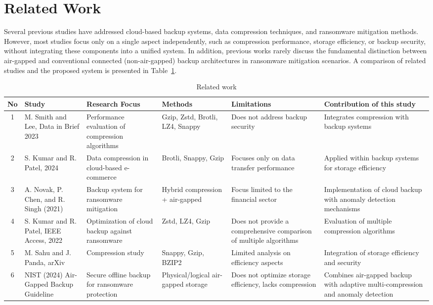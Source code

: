 \documentclass{iaesarticle}
\begin{document}
\section{Related Work}
\label{sec:related_work}
Several previous studies have addressed cloud-based backup systems, data compression techniques, and ransomware mitigation methods. However, most studies focus only on a single aspect independently, such as compression performance, storage efficiency, or backup security, without integrating these components into a unified system. In addition, previous works rarely discuss the fundamental distinction between air-gapped and conventional connected (non-air-gapped) backup architectures in ransomware mitigation scenarios. A comparison of related studies and the proposed system is presented in Table~\ref{tab:related_work}.

\begin{table}[H]
\centering
\fontsize{8pt}{10pt}\selectfont
\caption{Related work}
\label{tab:related_work}
\begin{tabularx}{\textwidth}{@{}c p{2.2cm} X X X X@{}}
\hline
\textbf{No} & \textbf{Study} & \textbf{Research Focus} & \textbf{Methods} & \textbf{Limitations} & \textbf{Contribution of this study} \\
\hline
1 & M. Smith and Lee, Data in Brief 2023 & Performance evaluation of compression algorithms & Gzip, Zstd, Brotli, LZ4, Snappy & Does not address backup security & Integrates compression with backup systems \\
2 & S. Kumar and R. Patel, 2024 & Data compression in cloud-based e-commerce & Brotli, Snappy, Gzip & Focuses only on data transfer performance & Applied within backup systems for storage efficiency \\
3 & A. Novak, P. Chen, and R. Singh (2021) & Backup system for ransomware mitigation & Hybrid compression + air-gapped & Focus limited to the financial sector & Implementation of cloud backup with anomaly detection mechanisms \\
4 & S. Kumar and R. Patel, IEEE Access, 2022 & Optimization of cloud backup against ransomware & Zstd, LZ4, Gzip & Does not provide a comprehensive comparison of multiple algorithms & Evaluation of multiple compression algorithms \\
5 & M. Sahu and J. Panda, arXiv & Compression study & Snappy, Gzip, BZIP2 & Limited analysis on efficiency aspects & Integration of storage efficiency and security \\
6 & NIST (2024) Air-Gapped Backup Guideline & Secure offline backup for ransomware protection & Physical/logical air-gapped storage & Does not optimize storage efficiency, lacks compression & Combines air-gapped backup with adaptive multi-compression and anomaly detection \\
\hline
\end{tabularx}
\end{table}
\end{document}
